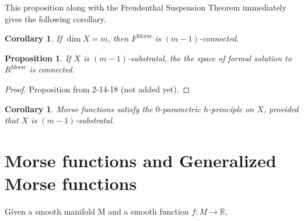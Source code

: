 \documentclass{article}
\newtheorem{proposition}[theorem]{Proposition}
\newtheorem{corollary}[theorem]{Corollary}
\newtheorem{proposed work}[theorem]{Proposed Work}
\DeclareMathOperator{\Morse}{Morse}
\begin{document}
This proposition along with the Freudenthal Suspension Theorem \cite{may1999concise} immediately gives the following corollary.

\begin{corollary}
If $\dim X = m$, then $F^{\Morse}$ is $(m-1)$-connected.
\end{corollary}

\begin{proposition}
If $X$ is $(m-1)$-substratal, the the space of formal solution to $R^{\Morse}$ is connected.
\end{proposition}

\begin{proof}
Proposition from 2-14-18 (not added yet).
\end{proof}

\begin{corollary}
Morse functions satisfy the $0$-parametric $h$-principle on $X$, provided that $X$ is $(m-1)$-substratal.
\end{corollary}




\section{Morse functions and Generalized Morse functions}

Given a smooth manifold M and a smooth function $f\colon M \to \mathbb{R},$
\end{document}
